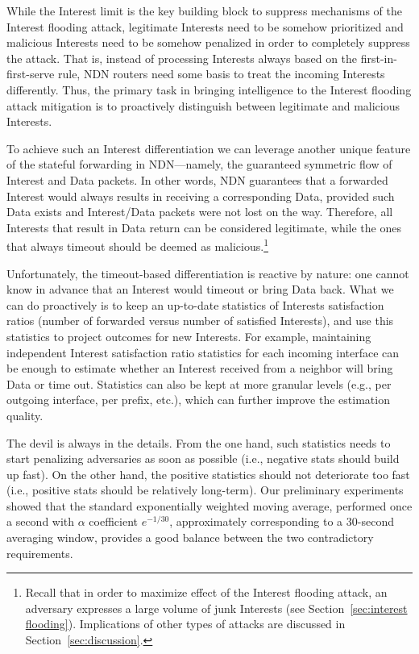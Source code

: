 While the Interest limit is the key building block to suppress mechanisms of the Interest flooding attack, legitimate Interests need to be somehow prioritized and malicious Interests need to be somehow penalized in order to completely suppress the attack.
That is, instead of processing Interests always based on the first-in-first-serve rule, NDN routers need some basis to treat the incoming Interests differently.
Thus, the primary task in bringing intelligence to the Interest flooding attack mitigation is to proactively distinguish between legitimate and malicious Interests.

To achieve such an Interest differentiation we can leverage another unique feature of the stateful forwarding in NDN---namely, the guaranteed symmetric flow of Interest and Data packets.
In other words, NDN guarantees that a forwarded Interest would always results in receiving a corresponding Data, provided such Data exists and Interest/Data packets were not lost on the way.
Therefore, all Interests that result in Data return can be considered legitimate, while the ones that always timeout should be deemed as malicious.\footnote{Recall that in order to maximize effect of the Interest flooding attack, an adversary expresses a large volume of junk Interests (see Section~\ref{sec:interest flooding}).  Implications of other types of attacks are discussed in Section~\ref{sec:discussion}.}

Unfortunately, the timeout-based differentiation is reactive by nature: one cannot know in advance that an Interest would timeout or bring Data back.
What we can do proactively is to keep an up-to-date statistics of Interests satisfaction ratios (number of forwarded versus number of satisfied Interests), and use this statistics to project outcomes for new Interests.
For example, maintaining independent Interest satisfaction ratio statistics for each incoming interface can be enough to estimate whether an Interest received from a neighbor will bring Data or time out.
Statistics can also be kept at more granular levels (e.g., per outgoing interface, per prefix, etc.), which can further improve the estimation quality.

The devil is always in the details.
From the one hand, such statistics needs to start penalizing adversaries as soon as possible (i.e., negative stats should build up fast).
On the other hand, the positive statistics should not deteriorate too fast (i.e., positive stats should be relatively long-term).
Our preliminary experiments showed that the standard exponentially weighted moving average, performed once a second with $\alpha$ coefficient $e^{-1/30}$, approximately corresponding to a 30-second averaging window, provides a good balance between the two contradictory requirements.

